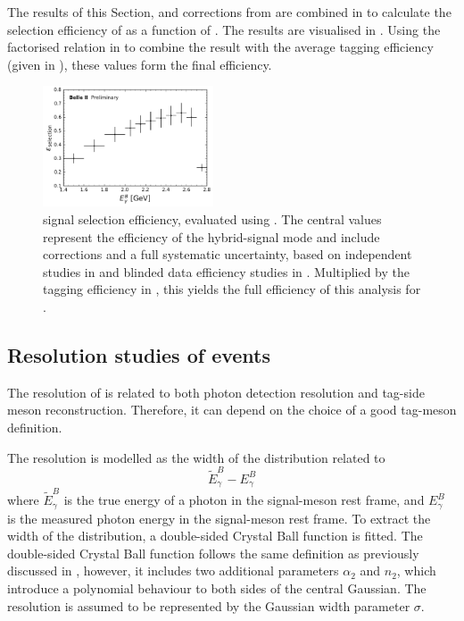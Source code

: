 The results of this Section,  and corrections from 
are combined in  to calculate the selection efficiency of \BtoXsgamma as a function of \EB.
The results are visualised in .
Using the factorised relation in  to combine the result with the average \FEI tagging efficiency (given in ), these values form the final
efficiency.

\begin{figure}[htbp!]  
    \centering
    \includegraphics[width=0.45\textwidth]{figures/signal_validation/corrected_selection_efficiency.pdf}
    \caption{\label{fig:corrected_signal_efficiency} \BtoXsgamma signal selection efficiency, evaluated using .
    The central values represent the efficiency of the hybrid-signal mode and include corrections and a full systematic uncertainty,
    based on independent studies in  and blinded data efficiency studies in .
    Multiplied by the \FEI tagging efficiency in , this yields the full efficiency of this analysis for \BtoXsgamma.
    }
\end{figure}

\subsection{Resolution studies of \texorpdfstring{\BtoXsgamma}{B->Xs gamma} events}\label{sec:resolution_studies}

The resolution of \EB is related to both photon detection resolution and tag-side \B meson reconstruction.
Therefore, it can depend on the choice of a good tag-\B meson definition.

The resolution is modelled as the width of the distribution related to
\begin{equation}\label{eq:resolution}
    \tilde{E}_{\gamma}^{B} - E_{\gamma}^{B}
\end{equation}
where $\tilde{E}_{\gamma}^{B}$ is the true energy of a photon in the signal-\B meson rest frame,
and $E_{\gamma}^{B}$ is the measured photon energy in the signal-\B meson rest frame.
To extract the width of the distribution, a double-sided Crystal Ball function is fitted.
The double-sided Crystal Ball function follows the same definition as previously discussed in ,
however, it includes two additional parameters $\alpha_2$ and $n_2$, which introduce a polynomial behaviour to both sides of the central Gaussian.
The resolution is assumed to be represented by the Gaussian width parameter $\sigma$.

